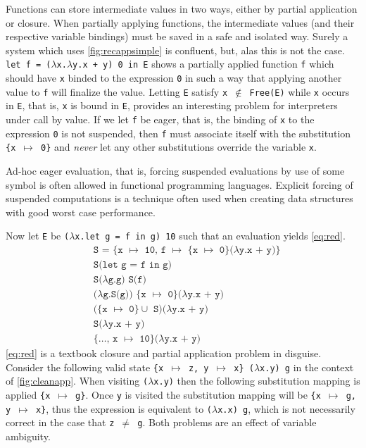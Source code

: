 \documentclass[11pt,oneside,a4paper]{report}
\begin{document}
Functions can store intermediate values in two ways, either by partial application or closure.
When partially applying functions, the intermediate values (and their respective variable bindings) must be saved in a safe and isolated way.
Surely a system which uses \autoref{fig:recappsimple} is confluent, but, alas this is not the case.
\texttt{let f = ($\lambda$x.$\lambda$y.x + y) 0 in E} shows a partially applied function \texttt{f} which should have \texttt{x} binded to the expression \texttt{0} in such a way that applying another value to \texttt{f} will finalize the value.
Letting \texttt{E} satisfy \texttt{x $\notin$ Free(E)} while \texttt{x} occurs in \texttt{E}, that is, \texttt{x} is bound in \texttt{E}, provides an interesting problem for interpreters under call by value.
If we let \texttt{f} be eager, that is, the binding of \texttt{x} to the expression \texttt{0} is not suspended, then \texttt{f} must associate itself with the substitution \texttt{\{x $\mapsto$ 0\}} and \textit{never} let any other substitutions override the variable \texttt{x}.
\begin{remark}
  Ad-hoc eager evaluation, that is, forcing suspended evaluations by use of some symbol is often allowed in functional programming languages.
  Explicit forcing of suspended computations is a technique often used when creating data structures with good worst case performance.
\end{remark}
\noindent Now let \texttt{E} be \texttt{($\lambda$x.let g = f in g) 10} such that an evaluation yields \autoref{eq:red}.
\begin{align}
  &\texttt{S = \{x $\mapsto$ 10, f $\mapsto$ \{x $\mapsto$ 0\}($\lambda$y.x + y)\}} \tag*{}\\
  &\texttt{S(let g = f in g)} \label{eq:red}\\
  &\texttt{S($\lambda$g.g) S(f)} \tag*{}\\
  &\texttt{($\lambda$g.S(g)) \{x $\mapsto$ 0\}($\lambda$y.x + y)} \tag*{}\\
  &\texttt{(\{x $\mapsto$ 0\} $\cup$ S)($\lambda$y.x + y)} \tag*{}\\
  &\texttt{S($\lambda$y.x + y)} \tag*{}\\
  &\texttt{\{$\dots$, x $\mapsto$ 10\}($\lambda$y.x + y)} \tag*{}
\end{align}
\autoref{eq:red} is a textbook closure and partial application problem in disguise.
Consider the following valid state \texttt{\{x $\mapsto$ z, y $\mapsto$ x\} ($\lambda$x.y) g} in the context of \autoref{fig:cleanapp}.
When visiting \texttt{($\lambda$x.y)} then the following substitution mapping is applied \texttt{\{x $\mapsto$ g\}}.
Once \texttt{y} is visited the substitution mapping will be \texttt{\{x $\mapsto$ g, y $\mapsto$ x\}}, thus the expression is equivalent to \texttt{($\lambda$x.x) g}, which is not necessarily correct in the case that \texttt{z $\neq$ g}.
Both problems are an effect of variable ambiguity.
\end{document}
